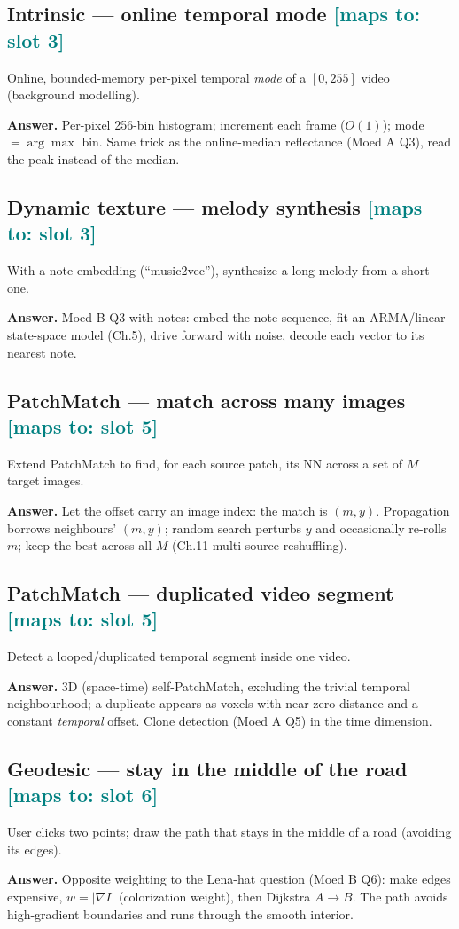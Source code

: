 \documentclass[11pt]{article}
\newcommand{\maps}[1]{{\small\textcolor{teal}{[maps to: #1]}}}
\newcommand{\ans}[1]{\begin{answer}\textbf{Answer.} #1\end{answer}}
\begin{document}
\subsection{Intrinsic --- online temporal mode \hfill \maps{slot 3}}
Online, bounded-memory per-pixel temporal \emph{mode} of a $[0,255]$ video (background modelling).
\ans{Per-pixel 256-bin histogram; increment each frame ($O(1)$); mode $=\arg\max$ bin. Same trick as the
online-median reflectance (Moed A Q3), read the peak instead of the median.}

\subsection{Dynamic texture --- melody synthesis \hfill \maps{slot 3}}
With a note-embedding (``music2vec''), synthesize a long melody from a short one.
\ans{Moed B Q3 with notes: embed the note sequence, fit an ARMA/linear state-space model (Ch.5), drive forward with
noise, decode each vector to its nearest note.}

\subsection{PatchMatch --- match across many images \hfill \maps{slot 5}}
Extend PatchMatch to find, for each source patch, its NN across a set of $M$ target images.
\ans{Let the offset carry an image index: the match is $(m,y)$. Propagation borrows neighbours' $(m,y)$; random
search perturbs $y$ and occasionally re-rolls $m$; keep the best across all $M$ (Ch.11 multi-source reshuffling).}

\subsection{PatchMatch --- duplicated video segment \hfill \maps{slot 5}}
Detect a looped/duplicated temporal segment inside one video.
\ans{3D (space-time) self-PatchMatch, excluding the trivial temporal neighbourhood; a duplicate appears as voxels
with near-zero distance and a constant \emph{temporal} offset. Clone detection (Moed A Q5) in the time dimension.}

\subsection{Geodesic --- stay in the middle of the road \hfill \maps{slot 6}}
User clicks two points; draw the path that stays in the middle of a road (avoiding its edges).
\ans{Opposite weighting to the Lena-hat question (Moed B Q6): make edges expensive, $w=|\nabla I|$ (colorization
weight), then Dijkstra $A\!\to\!B$. The path avoids high-gradient boundaries and runs through the smooth interior.}
\end{document}
